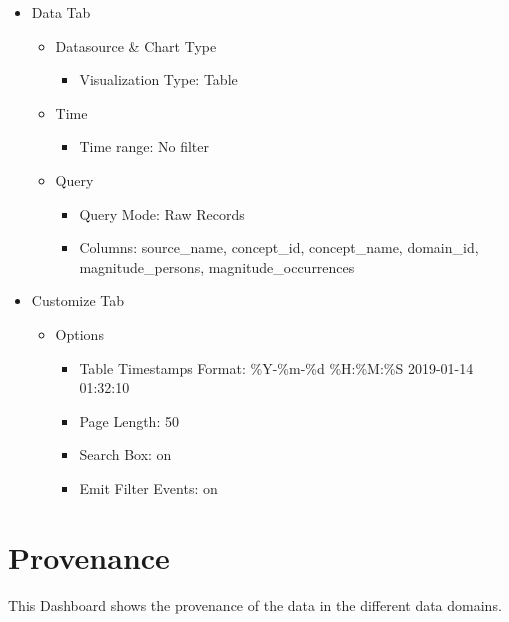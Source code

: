 \documentclass[
]{book}
\providecommand{\tightlist}{%
  \setlength{\itemsep}{0pt}\setlength{\parskip}{0pt}}
\begin{document}
\begin{itemize}
\tightlist
\item
  Data Tab

  \begin{itemize}
  \tightlist
  \item
    Datasource \& Chart Type

    \begin{itemize}
    \tightlist
    \item
      Visualization Type: Table
    \end{itemize}
  \item
    Time

    \begin{itemize}
    \tightlist
    \item
      Time range: No filter
    \end{itemize}
  \item
    Query

    \begin{itemize}
    \tightlist
    \item
      Query Mode: Raw Records
    \item
      Columns: source\_name, concept\_id, concept\_name, domain\_id, magnitude\_persons, magnitude\_occurrences
    \end{itemize}
  \end{itemize}
\item
  Customize Tab

  \begin{itemize}
  \tightlist
  \item
    Options

    \begin{itemize}
    \tightlist
    \item
      Table Timestamps Format: \%Y-\%m-\%d \%H:\%M:\%S \textbar{} 2019-01-14 01:32:10
    \item
      Page Length: 50
    \item
      Search Box: on
    \item
      Emit Filter Events: on
    \end{itemize}
  \end{itemize}
\end{itemize}

\hypertarget{provenance}{%
\section{Provenance}\label{provenance}}

This Dashboard shows the provenance of the data in the different data domains.
\end{document}
